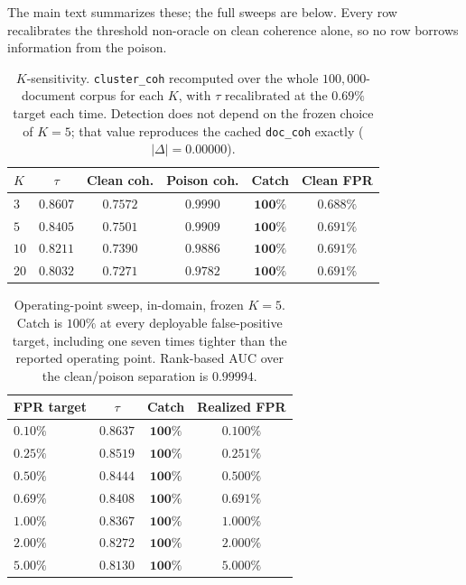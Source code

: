 \documentclass[10pt,journal,compsoc]{IEEEtran}
\begin{document}
The main text summarizes these; the full sweeps are below. Every row recalibrates the threshold
non-oracle on clean coherence alone, so no row borrows information from the poison.

\begin{table}[H]
\centering
\caption{$K$-sensitivity. \texttt{cluster\_coh} recomputed over the whole $100{,}000$-document
corpus for each $K$, with $\tau$ recalibrated at the $0.69\%$ target each time. Detection does
not depend on the frozen choice of $K=5$; that value reproduces the cached \texttt{doc\_coh}
exactly ($|\Delta|=0.00000$).}
\label{tab:ksens}
\begin{tabular}{lccccc}
\toprule
$K$ & $\tau$ & Clean coh. & Poison coh. & Catch & Clean FPR \\
\midrule
$3$  & $0.8607$ & $0.7572$ & $0.9990$ & $\mathbf{100\%}$ & $0.688\%$ \\
$5$  & $0.8405$ & $0.7501$ & $0.9909$ & $\mathbf{100\%}$ & $0.691\%$ \\
$10$ & $0.8211$ & $0.7390$ & $0.9886$ & $\mathbf{100\%}$ & $0.691\%$ \\
$20$ & $0.8032$ & $0.7271$ & $0.9782$ & $\mathbf{100\%}$ & $0.691\%$ \\
\bottomrule
\end{tabular}
\end{table}

\begin{table}[H]
\centering
\caption{Operating-point sweep, in-domain, frozen $K=5$. Catch is $100\%$ at every deployable
false-positive target, including one seven times tighter than the reported operating point.
Rank-based AUC over the clean/poison separation is $0.99994$.}
\label{tab:fprsweep}
\begin{tabular}{lccc}
\toprule
FPR target & $\tau$ & Catch & Realized FPR \\
\midrule
$0.10\%$ & $0.8637$ & $\mathbf{100\%}$ & $0.100\%$ \\
$0.25\%$ & $0.8519$ & $\mathbf{100\%}$ & $0.251\%$ \\
$0.50\%$ & $0.8444$ & $\mathbf{100\%}$ & $0.500\%$ \\
$0.69\%$ & $0.8408$ & $\mathbf{100\%}$ & $0.691\%$ \\
$1.00\%$ & $0.8367$ & $\mathbf{100\%}$ & $1.000\%$ \\
$2.00\%$ & $0.8272$ & $\mathbf{100\%}$ & $2.000\%$ \\
$5.00\%$ & $0.8130$ & $\mathbf{100\%}$ & $5.000\%$ \\
\bottomrule
\end{tabular}
\end{table}
\end{document}
